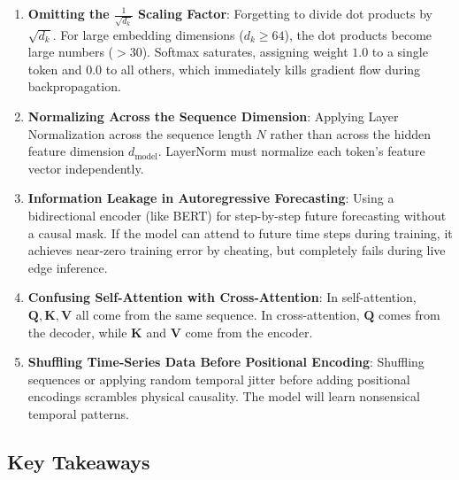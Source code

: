 \begin{warning}
\begin{enumerate}
    \item \textbf{Omitting the $\frac{1}{\sqrt{d_k}}$ Scaling Factor}: Forgetting to divide dot products by $\sqrt{d_k}$. For large embedding dimensions ($d_k \ge 64$), the dot products become large numbers ($>30$). Softmax saturates, assigning weight $1.0$ to a single token and $0.0$ to all others, which immediately kills gradient flow during backpropagation.
    \item \textbf{Normalizing Across the Sequence Dimension}: Applying Layer Normalization across the sequence length $N$ rather than across the hidden feature dimension $d_{\text{model}}$. LayerNorm must normalize each token's feature vector independently.
    \item \textbf{Information Leakage in Autoregressive Forecasting}: Using a bidirectional encoder (like BERT) for step-by-step future forecasting without a causal mask. If the model can attend to future time steps during training, it achieves near-zero training error by cheating, but completely fails during live edge inference.
    \item \textbf{Confusing Self-Attention with Cross-Attention}: In self-attention, $\mathbf{Q}, \mathbf{K}, \mathbf{V}$ all come from the same sequence. In cross-attention, $\mathbf{Q}$ comes from the decoder, while $\mathbf{K}$ and $\mathbf{V}$ come from the encoder.
    \item \textbf{Shuffling Time-Series Data Before Positional Encoding}: Shuffling sequences or applying random temporal jitter before adding positional encodings scrambles physical causality. The model will learn nonsensical temporal patterns.
\end{enumerate}
\end{warning}

\subsection{Key Takeaways}\label{subsec:takeaways}

